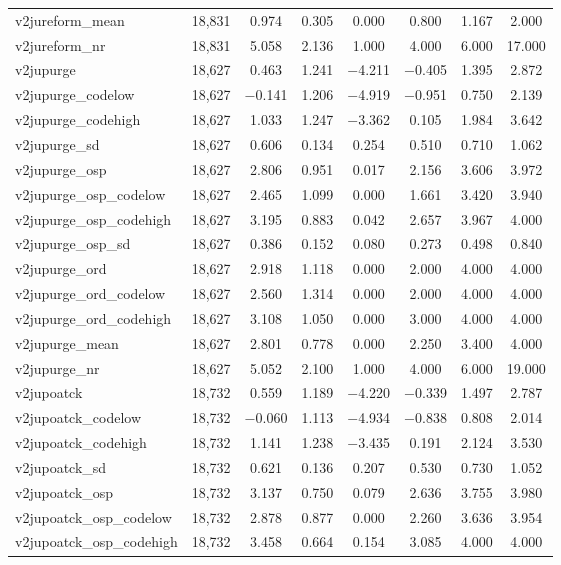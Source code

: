 \begin{table}[!htbp]
\begin{tabular}{@{\extracolsep{5pt}}lccccccc}
v2jureform\_mean & 18,831 & 0.974 & 0.305 & 0.000 & 0.800 & 1.167 & 2.000 \\ 
v2jureform\_nr & 18,831 & 5.058 & 2.136 & 1.000 & 4.000 & 6.000 & 17.000 \\ 
v2jupurge & 18,627 & 0.463 & 1.241 & $-$4.211 & $-$0.405 & 1.395 & 2.872 \\ 
v2jupurge\_codelow & 18,627 & $-$0.141 & 1.206 & $-$4.919 & $-$0.951 & 0.750 & 2.139 \\ 
v2jupurge\_codehigh & 18,627 & 1.033 & 1.247 & $-$3.362 & 0.105 & 1.984 & 3.642 \\ 
v2jupurge\_sd & 18,627 & 0.606 & 0.134 & 0.254 & 0.510 & 0.710 & 1.062 \\ 
v2jupurge\_osp & 18,627 & 2.806 & 0.951 & 0.017 & 2.156 & 3.606 & 3.972 \\ 
v2jupurge\_osp\_codelow & 18,627 & 2.465 & 1.099 & 0.000 & 1.661 & 3.420 & 3.940 \\ 
v2jupurge\_osp\_codehigh & 18,627 & 3.195 & 0.883 & 0.042 & 2.657 & 3.967 & 4.000 \\ 
v2jupurge\_osp\_sd & 18,627 & 0.386 & 0.152 & 0.080 & 0.273 & 0.498 & 0.840 \\ 
v2jupurge\_ord & 18,627 & 2.918 & 1.118 & 0.000 & 2.000 & 4.000 & 4.000 \\ 
v2jupurge\_ord\_codelow & 18,627 & 2.560 & 1.314 & 0.000 & 2.000 & 4.000 & 4.000 \\ 
v2jupurge\_ord\_codehigh & 18,627 & 3.108 & 1.050 & 0.000 & 3.000 & 4.000 & 4.000 \\ 
v2jupurge\_mean & 18,627 & 2.801 & 0.778 & 0.000 & 2.250 & 3.400 & 4.000 \\ 
v2jupurge\_nr & 18,627 & 5.052 & 2.100 & 1.000 & 4.000 & 6.000 & 19.000 \\ 
v2jupoatck & 18,732 & 0.559 & 1.189 & $-$4.220 & $-$0.339 & 1.497 & 2.787 \\ 
v2jupoatck\_codelow & 18,732 & $-$0.060 & 1.113 & $-$4.934 & $-$0.838 & 0.808 & 2.014 \\ 
v2jupoatck\_codehigh & 18,732 & 1.141 & 1.238 & $-$3.435 & 0.191 & 2.124 & 3.530 \\ 
v2jupoatck\_sd & 18,732 & 0.621 & 0.136 & 0.207 & 0.530 & 0.730 & 1.052 \\ 
v2jupoatck\_osp & 18,732 & 3.137 & 0.750 & 0.079 & 2.636 & 3.755 & 3.980 \\ 
v2jupoatck\_osp\_codelow & 18,732 & 2.878 & 0.877 & 0.000 & 2.260 & 3.636 & 3.954 \\ 
v2jupoatck\_osp\_codehigh & 18,732 & 3.458 & 0.664 & 0.154 & 3.085 & 4.000 & 4.000 \\ 

\end{tabular}
\end{table}
